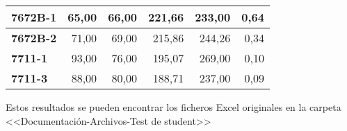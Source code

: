 \begin{table}[]
\begin{tabular}{@{} lrrrrr @{}}
\textbf{7672B-1}                 & 65,00                    & 66,00               & 221,66                   & 233,00              & 0,64                               \\ \midrule
\textbf{7672B-2}                 & 71,00                    & 69,00               & 215,86                   & 244,26              & 0,34                               \\ \midrule
\textbf{7711-1}                  & 93,00                    & 76,00               & 195,07                   & 269,00              & 0,10                               \\ \midrule
\textbf{7711-3}                  & 88,00                    & 80,00               & 188,71                   & 237,00              & 0,09                               \\ \bottomrule
\end{tabular}
\end{table}
Estos resultados se pueden encontrar los ficheros Excel originales en la carpeta <<Documentación-Archivos-Test de student>>